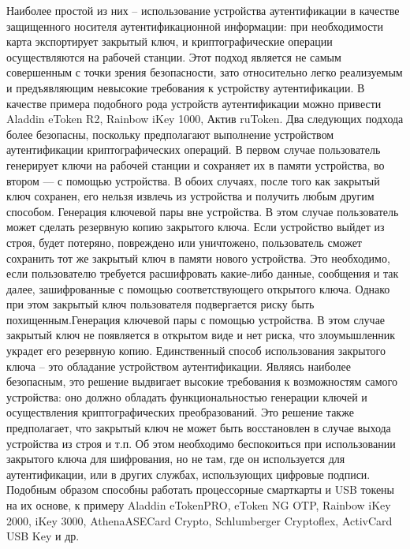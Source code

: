 Наиболее простой из них -- использование устройства аутентификации в качестве
защищенного носителя аутентификационной информации: при необходимости карта
экспортирует закрытый ключ, и криптографические операции осуществляются на
рабочей станции. Этот подход является не самым совершенным с точки зрения
безопасности, зато относительно легко реализуемым и предъявляющим невысокие
требования к устройству аутентификации. В качестве примера подобного рода
устройств аутентификации можно привести Aladdin eToken R2, Rainbow iKey 1000,
Актив ruToken. Два следующих подхода более безопасны, поскольку предполагают
выполнение устройством аутентификации криптографических операций. В первом
случае пользователь генерирует ключи на рабочей станции и сохраняет их в памяти
устройства, во втором — с помощью устройства. В обоих случаях, после того как
закрытый ключ сохранен, его нельзя извлечь из устройства и получить любым другим
способом. Генерация ключевой пары вне устройства. В этом случае пользователь
может сделать резервную копию закрытого ключа. Если устройство выйдет из строя,
будет потеряно, повреждено или уничтожено, пользователь сможет сохранить тот же
закрытый ключ в памяти нового устройства. Это необходимо, если пользователю
требуется расшифровать какие-либо данные, сообщения и так далее, зашифрованные с
помощью соответствующего открытого ключа. Однако при этом закрытый ключ
пользователя подвергается риску быть похищенным.Генерация ключевой пары с
помощью устройства. В этом случае закрытый ключ не появляется в открытом виде и
нет риска, что злоумышленник украдет его резервную копию. Единственный способ
использования закрытого ключа -- это обладание устройством аутентификации.
Являясь наиболее безопасным, это решение выдвигает высокие требования к
возможностям самого устройства: оно должно обладать функциональностью генерации
ключей и осуществления криптографических преобразований. Это решение также
предполагает, что закрытый ключ не может быть восстановлен в случае выхода
устройства из строя и т.п. Об этом необходимо беспокоиться при использовании
закрытого ключа для шифрования, но не там, где он используется для
аутентификации, или в других службах, использующих цифровые подписи. Подобным
образом способны работать процессорные смарткарты и USB токены на их основе, к
примеру Aladdin eTokenPRO, eToken NG OTP, Rainbow iKey 2000, iKey 3000,
AthenaASECard Crypto, Schlumberger Cryptoflex, ActivCard USB Key и др.~\cite{auth_n_aut}